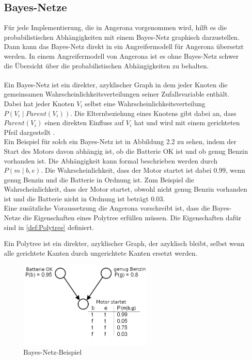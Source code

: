 \documentclass[german,version-2020-11]{uzl-thesis}
\begin{document}
\subsection{Bayes-Netze}
Für jede Implementierung, die in Angerona vorgenommen wird, hilft es die probabilistischen Abhängigkeiten mit einem Bayes-Netz graphisch darzustellen. Dann kann das Bayes-Netz direkt in ein Angreifermodell für Angerona übersetzt werden. In einem Angreifermodell von Angerona ist es ohne Bayes-Netz schwer die Übersicht über die probabilistischen Abhängigkeiten zu behalten.\\ \\
Ein Bayes-Netz ist ein direkter, azyklischer Graph in dem jeder Knoten die gemeinsamen Wahrscheinlichkeitsverteilungen seiner Zufallsvariable enthält. Dabei hat jeder Knoten $V_i$ selbst eine Wahrscheinlichkeitsverteilung $P(V_i \mid Parent(V_i) )$. Die Elternbeziehung eines Knotens gibt dabei an, dass $Parent(V_i) $ einen direkten Einfluss auf $V_i$ hat und wird  mit einem gerichteten Pfeil dargestellt \cite{3}.\\  Ein Beispiel für solch ein Bayes-Netz ist in Abbildung 2.2 zu sehen, indem der Start des Motors davon abhängig ist, ob die Batterie OK ist und ob genug Benzin vorhanden ist. Die Abhängigkeit kann formal beschrieben werden durch $P(m \mid b,e)$. Die Wahrscheinlichkeit, dass der Motor startet ist dabei $0.99$, wenn genug Benzin und die Batterie in Ordnung ist. Zum Beispiel die Wahrscheinlichkeit, dass der Motor startet, obwohl nicht genug Benzin vorhanden ist und die Batterie nicht in Ordnung ist beträgt $0.03$. \\
Eine zusätzliche Voraussetzung die Angerona vorschreibt ist, dass die Bayes-Netze die Eigenschaften eines Polytree erfüllen müssen. Die Eigenschaften dafür sind in \cref{def:Polytree} definiert.
 \begin{definition}[Polytree]\label{def:Polytree}
	Ein Polytree ist ein direkter, azyklischer Graph, der azyklisch bleibt, selbst wenn alle gerichtete Kanten durch ungerichtete Kanten ersetzt werden.
\end{definition}
\begin{figure}[ht]
	\centering
	\includegraphics[width=0.6\textwidth]{bayes-netz-bsp.PNG}
	\caption{Bayes-Netz-Beispiel \cite{10}}
	\label{fig}
\end{figure}
\end{document}
